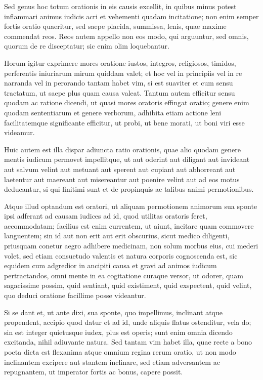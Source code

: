  Sed genus hoc totum orationis in eis causis excellit, in quibus minus potest inflammari animus iudicis acri et vehementi quadam incitatione; non enim semper fortis oratio quaeritur, sed saepe placida, summissa, lenis, quae maxime commendat reos. Reos autem appello non eos modo, qui arguuntur, sed omnis, quorum de re disceptatur; sic enim olim loquebantur.

 Horum igitur exprimere mores oratione iustos, integros, religiosos, timidos, perferentis iniuriarum mirum quiddam valet; et hoc vel in principiis vel in re narranda vel in perorando tantam habet vim, si est suaviter et cum sensu tractatum, ut saepe plus quam causa valeat. Tantum autem efficitur sensu quodam ac ratione dicendi, ut quasi mores oratoris effingat oratio; genere enim quodam sententiarum et genere verborum, adhibita etiam actione leni facilitatemque significante efficitur, ut probi, ut bene morati, ut boni viri esse videamur.

 Huic autem est illa dispar adiuncta ratio orationis, quae alio quodam genere mentis iudicum permovet impellitque, ut aut oderint aut diligant aut invideant aut salvum velint aut metuant aut sperent aut cupiant aut abhorreant aut laetentur aut maereant aut misereantur aut poenire velint aut ad eos motus deducantur, si qui finitimi sunt et de propinquis ac talibus animi permotionibus.

 Atque illud optandum est oratori, ut aliquam permotionem animorum sua sponte ipsi adferant ad causam iudices ad id, quod utilitas oratoris feret, accommodatam; facilius est enim currentem, ut aiunt, incitare quam commovere languentem; sin id aut non erit aut erit obscurius, sicut medico diligenti, priusquam conetur aegro adhibere medicinam, non solum morbus eius, cui mederi volet, sed etiam consuetudo valentis et natura corporis cognoscenda est, sic equidem cum adgredior in ancipiti causa et gravi ad animos iudicum pertractandos, omni mente in ea cogitatione curaque versor, ut odorer, quam sagacissime possim, quid sentiant, quid existiment, quid exspectent, quid velint, quo deduci oratione facillime posse videantur.

 Si se dant et, ut ante dixi, sua sponte, quo impellimus, inclinant atque propendent, accipio quod datur et ad id, unde aliquis flatus ostenditur, vela do; sin est integer quietusque iudex, plus est operis; sunt enim omnia dicendo excitanda, nihil adiuvante natura. Sed tantam vim habet illa, quae recte a bono poeta dicta est flexanima atque omnium regina rerum oratio, ut non modo inclinantem excipere aut stantem inclinare, sed etiam adversantem ac repugnantem, ut imperator fortis ac bonus, capere possit.

